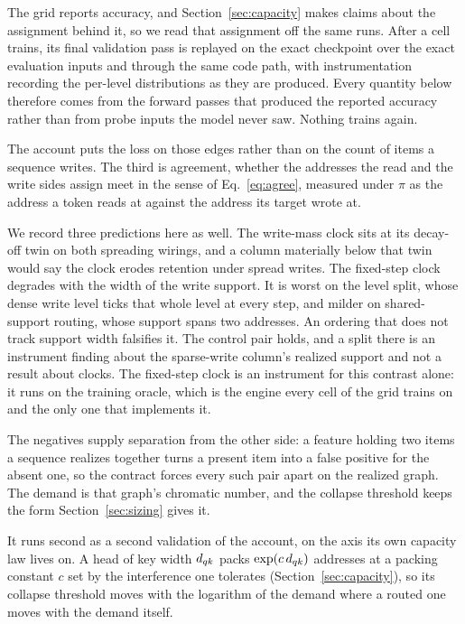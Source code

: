 The grid reports accuracy, and Section~\ref{sec:capacity} makes claims about the assignment behind it, so we read that assignment off the same runs. After a cell trains, its final validation pass is replayed on the exact checkpoint over the exact evaluation inputs and through the same code path, with instrumentation recording the per-level distributions as they are produced. Every quantity below therefore comes from the forward passes that produced the reported accuracy rather than from probe inputs the model never saw. Nothing trains again.

The account puts the loss on those edges rather than on the count of items a sequence writes. The third is agreement, whether the addresses the read and the write sides assign meet in the sense of Eq.~\eqref{eq:agree}, measured under $\pi$ as the address a token reads at against the address its target wrote at.

We record three predictions here as well. The write-mass clock sits at its decay-off twin on both spreading wirings, and a column materially below that twin would say the clock erodes retention under spread writes. The fixed-step clock degrades with the width of the write support. It is worst on the level split, whose dense write level ticks that whole level at every step, and milder on shared-support routing, whose support spans two addresses. An ordering that does not track support width falsifies it. The control pair holds, and a split there is an instrument finding about the sparse-write column's realized support and not a result about clocks. The fixed-step clock is an instrument for this contrast alone: it runs on the training oracle, which is the engine every cell of the grid trains on and the only one that implements it.

The negatives supply separation from the other side: a feature holding two items a sequence realizes together turns a present item into a false positive for the absent one, so the contract forces every such pair apart on the realized graph. The demand is that graph's chromatic number, and the collapse threshold keeps the form Section~\ref{sec:sizing} gives it.

It runs second as a second validation of the account, on the axis its own capacity law lives on. A head of key width $d_{qk}$ packs $\exp(c\,d_{qk})$ addresses at a packing constant $c$ set by the interference one tolerates (Section~\ref{sec:capacity}), so its collapse threshold moves with the logarithm of the demand where a routed one moves with the demand itself.

